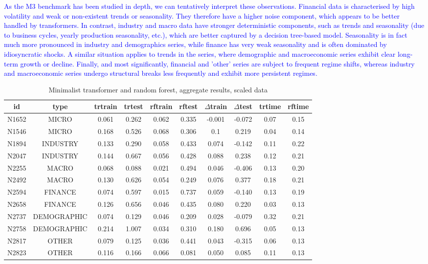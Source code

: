 \documentclass[algorithms,article,submit,pdftex,moreauthors]{Definitions/mdpi}
\begin{document}
\textcolor{blue}{As the M3 benchmark has been studied in depth, we can tentatively interpret these observations. Financial data is characterised by high volatility and weak or non-existent trends or seasonality. They therefore have a higher noise component, which appears to be better handled by transformers. In contrast, industry and macro data have stronger deterministic components, such as trends and seasonality (due to business cycles, yearly production seasonality, etc.), which are better captured by a decision tree-based model.
Seasonality is in fact much more pronounced in industry and demographics series, while finance has very weak seasonality and is often dominated by idiosyncratic shocks. A similar situation applies to trends in the series, where demographic and macroeconomic series exhibit clear long-term growth or decline. Finally, and most significantly, financial and 'other' series are subject to frequent regime shifts, whereas industry and macroeconomic series undergo structural breaks less frequently and exhibit more persistent regimes.}

\begin{table}[H]
\caption{Minimalist transformer and random forest, aggregate results, scaled data}
\label{tab:bestworse}
\centering
\footnotesize
\begin{tabular}{cccccccccc}
\toprule
id   & type        & trtrain & trtest & rftrain & rftest & $\Delta$train & $\Delta$test & trtime & rftime \\
\midrule
\small N1652 & \footnotesize MICRO       & 0.061 & 0.262 & 0.062 & 0.335 & -0.001 &-0.072& 0.07&0.15\\
\small N1546 & \footnotesize MICRO       & 0.168 & 0.526 & 0.068 & 0.306 & 0.1   &  0.219& 0.04&0.14\\
\small N1894 & \footnotesize INDUSTRY    & 0.133 & 0.290 & 0.058 & 0.433 & 0.074 & -0.142&0.11&0.22\\
\small N2047 & \footnotesize INDUSTRY    & 0.144 & 0.667 & 0.056 & 0.428 & 0.088 &  0.238&0.12&0.21\\
\small N2255 & \footnotesize MACRO       & 0.068 & 0.088 & 0.021 & 0.494 & 0.046 & -0.406&0.13&0.20\\
\small N2492 & \footnotesize MACRO       & 0.130 & 0.626 & 0.054 & 0.249 & 0.076 &  0.377&0.18&0.21\\
\small N2594 & \footnotesize FINANCE     & 0.074 & 0.597 & 0.015 & 0.737 & 0.059 & -0.140&0.13&0.19\\
\small N2658 & \footnotesize FINANCE     & 0.126 & 0.656 & 0.046 & 0.435 & 0.080 &  0.220&0.03&0.13\\
\small N2737 & \footnotesize DEMOGRAPHIC & 0.074 & 0.129 & 0.046 & 0.209 & 0.028 & -0.079&0.32&0.21\\
\small N2758 & \footnotesize DEMOGRAPHIC & 0.214 & 1.007 & 0.034 & 0.310 & 0.180 &  0.696&0.05&0.13\\
\small N2817 & \footnotesize OTHER       & 0.079 & 0.125 & 0.036 & 0.441 & 0.043 & -0.315&0.06&0.13\\
\small N2823 & \footnotesize OTHER       & 0.116 & 0.166 & 0.066 & 0.081 & 0.050 &  0.085&0.11&0.13\\
\bottomrule
\end{tabular}
\end{table}
\end{document}
